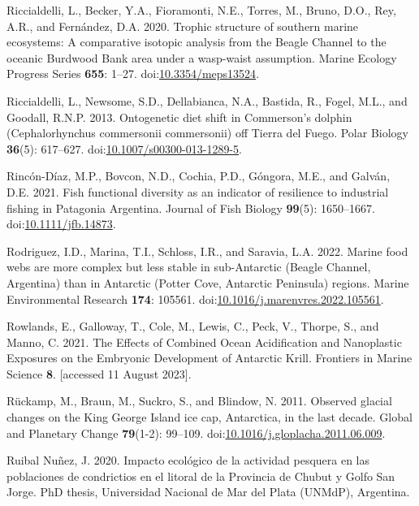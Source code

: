 \documentclass[
]{article}
\newlength{\cslhangindent}
\newenvironment{CSLReferences}[2] %
 {\begin{list}{}{%
  \setlength{\itemindent}{0pt}
  \setlength{\leftmargin}{0pt}
  \setlength{\parsep}{0pt}
  \ifodd #1
   \setlength{\leftmargin}{\cslhangindent}
   \setlength{\itemindent}{-1\cslhangindent}
  \fi
  \setlength{\itemsep}{#2\baselineskip}}}
 {\end{list}}
\begin{document}
\begin{CSLReferences}{1}{0}
Riccialdelli, L., Becker, Y.A., Fioramonti, N.E., Torres, M., Bruno,
D.O., Rey, A.R., and Fernández, D.A. 2020. Trophic structure of southern
marine ecosystems: A comparative isotopic analysis from the {Beagle
Channel} to the oceanic {Burdwood Bank} area under a wasp-waist
assumption. Marine Ecology Progress Series \textbf{655}: 1--27.
doi:\href{https://doi.org/10.3354/meps13524}{10.3354/meps13524}.

Riccialdelli, L., Newsome, S.D., Dellabianca, N.A., Bastida, R., Fogel,
M.L., and Goodall, R.N.P. 2013. Ontogenetic diet shift in {Commerson}'s
dolphin ({Cephalorhynchus} commersonii commersonii) off {Tierra} del
{Fuego}. Polar Biology \textbf{36}(5): 617--627.
doi:\href{https://doi.org/10.1007/s00300-013-1289-5}{10.1007/s00300-013-1289-5}.

Rincón-Díaz, M.P., Bovcon, N.D., Cochia, P.D., Góngora, M.E., and
Galván, D.E. 2021. Fish functional diversity as an indicator of
resilience to industrial fishing in {Patagonia Argentina}. Journal of
Fish Biology \textbf{99}(5): 1650--1667.
doi:\href{https://doi.org/10.1111/jfb.14873}{10.1111/jfb.14873}.

Rodriguez, I.D., Marina, T.I., Schloss, I.R., and Saravia, L.A. 2022.
Marine food webs are more complex but less stable in sub-{Antarctic}
({Beagle Channel}, {Argentina}) than in {Antarctic} ({Potter Cove},
{Antarctic Peninsula}) regions. Marine Environmental Research
\textbf{174}: 105561.
doi:\href{https://doi.org/10.1016/j.marenvres.2022.105561}{10.1016/j.marenvres.2022.105561}.

Rowlands, E., Galloway, T., Cole, M., Lewis, C., Peck, V., Thorpe, S.,
and Manno, C. 2021. The {Effects} of {Combined Ocean Acidification} and
{Nanoplastic Exposures} on the {Embryonic Development} of {Antarctic
Krill}. Frontiers in Marine Science \textbf{8}. {[}accessed 11 August
2023{]}.

Rückamp, M., Braun, M., Suckro, S., and Blindow, N. 2011. Observed
glacial changes on the {King George Island} ice cap, {Antarctica}, in
the last decade. Global and Planetary Change \textbf{79}(1-2): 99--109.
doi:\href{https://doi.org/10.1016/j.gloplacha.2011.06.009}{10.1016/j.gloplacha.2011.06.009}.

Ruibal Nuñez, J. 2020. {Impacto ecol{ó}gico de la actividad pesquera en
las poblaciones de condrictios en el litoral de la Provincia de Chubut y
Golfo San Jorge}. PhD thesis, Universidad Nacional de Mar del Plata
(UNMdP), Argentina.


\end{CSLReferences}
\end{document}

